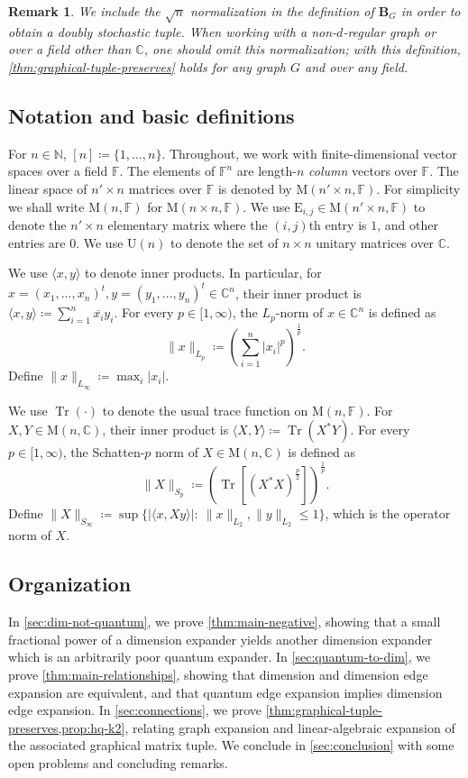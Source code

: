 \documentclass[11pt]{article}
\newtheorem{remark}[theorem]{Remark}
\newcommand{\C}{{\mathbb C}}
\newcommand{\N}{{\mathbb N}}
\theoremstyle{plain}
\numberwithin{equation}{section}
\theoremstyle{definition}
\newcommand{\F}{\mathbb{F}}
\newcommand{\bC}{\mathbb{C}}
\DeclareMathOperator{\trace}{Tr}
\newcommand{\norm}[1]{\lVert#1\rVert}
\newcommand{\M}{\mathrm{M}}
\newcommand{\U}{\mathrm{U}}
\newcommand{\tuple}[1]{\mathbf{#1}}
\newcommand{\vB}{\tuple{B}}
\newcommand{\E}{\mathrm{E}}
\begin{document}
\begin{remark}
    We include the $\sqrt n$ normalization in the definition of $\vB_G$ in order to obtain a doubly stochastic tuple. When working with a non-$d$-regular graph or over a field other than $\bC$, one should omit this normalization; with this definition, \cref{thm:graphical-tuple-preserves} holds for any graph $G$ and over any field.
\end{remark}





\subsection{Notation and basic definitions}\label{sec:prel}
For $n\in \N$, $[n]\coloneqq \{1, \dots, n\}$. 
Throughout, we work with finite-dimensional vector spaces over a field $\F$. 
The elements of $\F^n$ are length-$n$ \emph{column} vectors over 
$\F$. 
The linear space of 
$n'\times n$ matrices over $\F$ is denoted by $\M(n'\times n,\F)$. For simplicity we shall write 
$\M(n,\F)$ for 
$\M(n\times n,\F)$. We use $\E_{i, j}\in \M(n'\times n, \F)$ to denote 
the $n'\times n$ elementary matrix where the $(i, j)$th entry is $1$, and other entries are $0$. We use $\U(n)$ to denote the set of $n\times n$ unitary matrices over $\C$. 

We use $\langle x, y\rangle$ to denote inner products. In particular, for $x=(x_1, \dots, x_n)^t,y=(y_1, \dots, y_n)^t\in\bC^n$, their inner product is
$
\langle x,y\rangle\coloneqq \sum_{i=1}^n \overline{x_i}y_i.
$
For every $p\in[1,\infty)$, the $L_p$-norm of $x\in\bC^n$ 
is defined as 
\[
\norm{x}_{L_p}\coloneqq \left(\sum^n_{i=1}|x_i|^p\right)^{\frac{1}{p}}.
\]
Define $\norm{x}_{L_\infty}\coloneqq \max_i|x_i|$. 

We use $\trace(\cdot)$ to denote the usual trace function on $\M(n,\F)$. For $X,Y\in \M(n,\bC)$, their inner product is $\langle X,Y\rangle\coloneqq \trace(X^*Y)$.
For every $p\in[1,\infty)$, the Schatten-$p$ norm of $X\in \M(n,\bC)$ is defined as
\[
\norm{X}_{S_p}\coloneqq \left(\trace\left[(X^*X)^{\frac{p}{2}}\right]\right)^{\frac{1}{p}}.
\]
Define $\norm{X}_{S_\infty}\coloneqq \sup\{|\langle 
x,Xy\rangle|:~\norm{x}_{L_2},\norm{y}_{L_2}\leq 1\}$, which is the operator norm 
of $X$. 

\subsection{Organization}
In \cref{sec:dim-not-quantum}, we prove \cref{thm:main-negative}, showing that a small fractional power of a dimension expander yields another dimension expander which is an arbitrarily poor quantum expander. In \cref{sec:quantum-to-dim}, we prove \cref{thm:main-relationships}, showing that dimension and dimension edge expansion are equivalent, and that quantum edge expansion implies dimension edge expansion. In \cref{sec:connections}, we prove \cref{thm:graphical-tuple-preserves,prop:hq-k2}, relating graph expansion and linear-algebraic expansion of the associated graphical matrix tuple. We conclude in \cref{sec:conclusion} with some open problems and concluding remarks.
\end{document}
